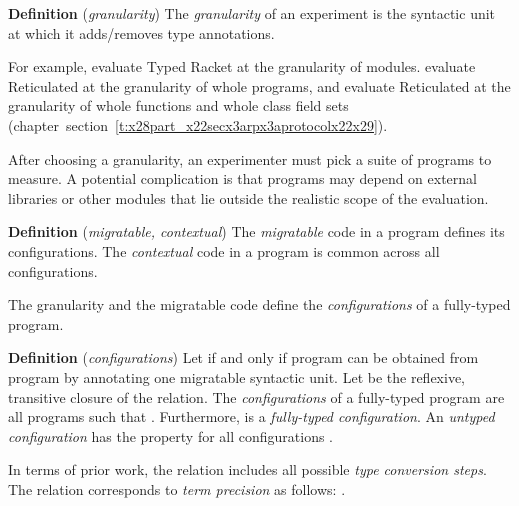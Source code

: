 \documentclass[ twoside,open=right,titlepage,numbers=noenddot,headinclude,%
                footinclude=true,cleardoublepage=empty,abstract=off,
                BCOR=5mm,paper=a4,fontsize=11pt,%
                ngerman,american,%
                parts,pdfspacing]{scrreprt}
\newcommand{\SecRef}[2]{section~#1}
\newcommand{\SecRefLocal}[3]{\hyperref[#1]{\SecRef{#2}{#3}}}
\renewcommand{\SecRefLocal}[3]{section~\ref{#1}}
\begin{document}
\relax{\vspace{1ex}
}\textbf{Definition} (\emph{granularity}) The \emph{granularity} of an experiment is the syntactic unit at which
 it adds/removes type annotations.\relax{\vspace{1ex}
}

For example,  evaluate Typed Racket at the granularity
 of modules.
 evaluate Reticulated at the granularity of whole programs,
 and  evaluate Reticulated at the granularity of whole
 functions and whole class field sets (chapter~\SecRefLocal{t:x28part_x22secx3arpx3aprotocolx22x29}{3.6.1}{Protocol}).

After choosing a granularity, an experimenter must pick a suite of
 programs to measure.
A potential complication is that programs may depend on external libraries
 or other modules that lie outside the realistic scope of the evaluation.

\relax{\vspace{1ex}
}\textbf{Definition} (\emph{migratable, contextual}) The \emph{migratable} code in a program defines its configurations.
The \emph{contextual} code in a program is common across all configurations.\relax{\vspace{1ex}
}

The granularity and the migratable code define the
 \emph{configurations} of a fully{-}typed program.

\relax{\vspace{1ex}
}\textbf{Definition} (\emph{configurations}) Let 
 if and only if program  can be obtained from program
  by annotating one migratable syntactic unit.
Let \relax{$\tcmulti$} be the reflexive, transitive closure of the \relax{$\tcstep$}
 relation.
The \emph{configurations} of a fully{-}typed program  are all
 programs  such that .
Furthermore,  is a \emph{fully{-}typed configuration}.
An \emph{untyped configuration}  has the property 
 for all configurations .\relax{\vspace{1ex}
}

\noindent{}In terms of prior work, the \relax{$\tcstep$} relation includes all
 possible \emph{type conversion steps}.
The \relax{$\tcmulti$} relation corresponds to \emph{term precision} as follows:
 .
\end{document}
